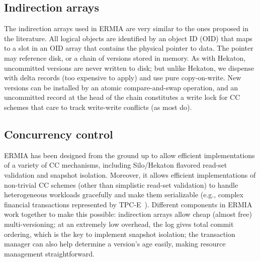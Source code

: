 
\subsection{Indirection arrays}
The indirection arrays used in ERMIA are very similar to the ones proposed in the literature. All logical objects are identified by an object ID (OID) that maps to a slot in an OID array that contains the physical pointer to data. The pointer may reference disk, or a chain of versions stored in memory. As with Hekaton, uncommitted versions are never written to disk; but unlike Hekaton, we dispense with delta records (too expensive to apply) and use pure copy-on-write. New versions can be installed by an atomic compare-and-swap operation, and an uncommitted record at the head of the chain constitutes a write lock for CC schemes that care to track write-write conflicts (as most do). 

\subsection{Concurrency control}

ERMIA has been designed from the ground up to allow efficient implementations of a variety of CC mechanisms, including Silo/Hekaton flavored read-set validation and snapshot isolation. Moreover, it allows efficient implementations of non-trivial CC schemes (other than simplistic read-set validation) to handle heterogeneous workloads gracefully and make them serializable (e.g., complex financial transactions represented by TPC-E~\cite{TPCE}). Different components in ERMIA work together to make this possible: indirection arrays allow cheap (almost free) multi-versioning; at an extremely low overhead, the log gives total commit ordering, which is the key to implement snapshot isolation; the transaction manager can also help determine a version's age easily, making resource management straightforward.

